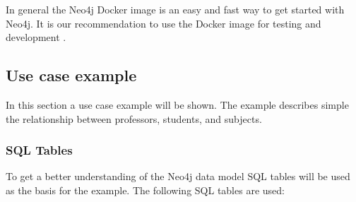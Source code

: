 In general the Neo4j Docker image is an easy and fast way to get started with
Neo4j. It is our recommendation to use the Docker image for testing and
development \parencite{neo4j:docker}.

\subsection{Use case example}
In this section a use case example will be shown. The example describes simple
the relationship between professors, students, and subjects.
\subsubsection{SQL Tables}
To get a better understanding of the Neo4j data model SQL tables will be used as
the basis for the example. The following SQL tables are used:

